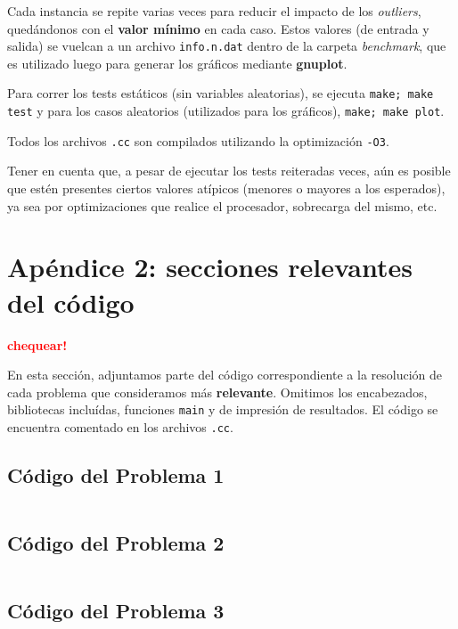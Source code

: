\documentclass[a4paper]{article}
\begin{document}
Cada instancia se repite varias veces para reducir el impacto de los \textit{outliers}, quedándonos
con el \textbf{valor mínimo} en cada caso. Estos valores (de entrada y salida) se vuelcan a un archivo
\verb|info.n.dat| dentro de la carpeta \textit{benchmark}, que es utilizado luego para generar los gráficos
mediante \textbf{gnuplot}. \medskip

Para correr los tests estáticos (sin variables aleatorias), se ejecuta \verb|make; make test| y para los
casos aleatorios (utilizados para los gráficos), \verb|make; make plot|.

Todos los archivos \verb|.cc| son compilados utilizando la optimización \verb|-O3|. \medskip

Tener en cuenta que, a pesar de ejecutar los tests reiteradas veces, aún es posible que estén presentes ciertos
valores atípicos (menores o mayores a los esperados), ya sea por optimizaciones que realice el procesador, sobrecarga
del mismo, etc.
\newpage

\section{Apéndice 2: secciones relevantes del código}

\textcolor{red}{\textbf{chequear!}} \medskip

En esta sección, adjuntamos parte del código correspondiente a la resolución de cada problema
que consideramos más \textbf{relevante}. Omitimos los encabezados, bibliotecas incluídas,
funciones \verb|main| y de impresión de resultados. El código se encuentra comentado en los
archivos \verb|.cc|.

\subsection{Código del Problema 1}


\begin{lstlisting}
\end{lstlisting}

\vspace*{0.5cm}


\newpage


\subsection{Código del Problema 2}


\begin{lstlisting}
\end{lstlisting}

\vspace*{0.5cm}


\newpage


\subsection{Código del Problema 3}


\begin{lstlisting}
\end{lstlisting}

\vspace*{0.5cm}
\end{document}
